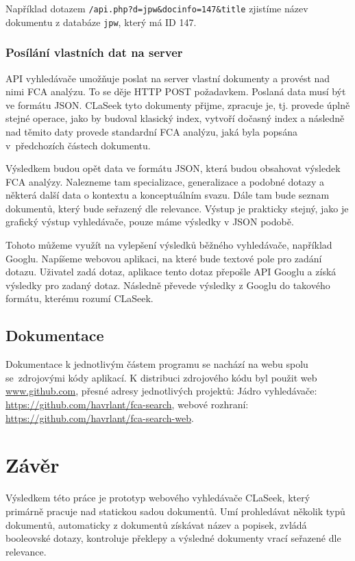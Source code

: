 \documentclass{article}
\newcommand{\name}{CLaSeek}
\newcommand{\code}[1]{\texttt{#1}}
\newcommand{\ssection}[1]{\subsection{#1}}
\newcommand{\sssection}[1]{\subsubsection{#1}}
\begin{document}
Například dotazem \code{/api.php?d=jpw\&docinfo=147\&title} zjistíme název dokumentu z databáze \code{jpw}, který má ID 147.

\sssection{Posílání vlastních dat na server}\label{ch.apipost}
API vyhledávače umožňuje poslat na server vlastní dokumenty a provést nad nimi FCA analýzu. To se děje HTTP POST požadavkem. Poslaná data musí být ve formátu JSON. \name{} tyto dokumenty přijme, zpracuje je, tj. provede úplně stejné operace, jako by budoval klasický index, vytvoří dočasný index a následně nad těmito daty provede standardní FCA analýzu, jaká byla popsána v~předchozích částech dokumentu. 

Výsledkem budou opět data ve formátu JSON, která budou obsahovat výsledek FCA analýzy. Nalezneme tam specializace, generalizace a podobné dotazy a některá další data o kontextu a konceptuálním svazu. Dále tam bude seznam dokumentů, který bude seřazený dle relevance. Výstup je prakticky stejný, jako je grafický výstup vyhledávače, pouze máme výsledky v JSON podobě. 

Tohoto můžeme využít na vylepšení výsledků běžného vyhledávače, například Googlu. Napíšeme webovou aplikaci, na které bude textové pole pro zadání dotazu. Uživatel zadá dotaz, aplikace tento dotaz přepošle API Googlu a získá výsledky pro zadaný dotaz. Následně převede výsledky z Googlu do takového formátu, kterému rozumí \name.


\ssection{Dokumentace}\label{ch.dokumentace}
Dokumentace k jednotlivým částem programu se nachází na webu spolu se~zdrojovými kódy aplikací. K distribuci zdrojového kódu byl použit web \url{www.github.com}, přesné adresy jednotlivých projektů: Jádro vyhledávače: \url{https://github.com/havrlant/fca-search}, webové rozhraní: \url{https://github.com/havrlant/fca-search-web}.

\newpage
\section{Závěr}
Výsledkem této práce je prototyp webového vyhledávače \name{}, který primárně pracuje nad statickou sadou dokumentů. Umí prohledávat několik typů dokumentů, automaticky z dokumentů získávat název a popisek, zvládá booleovské dotazy, kontroluje překlepy a výsledné dokumenty vrací seřazené dle relevance. 
\end{document}
